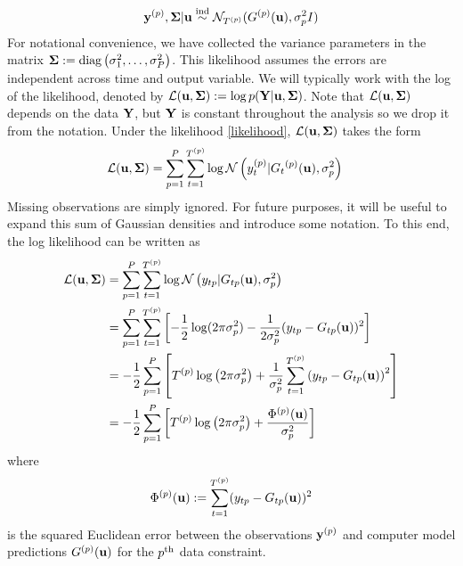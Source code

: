 \documentclass[12pt]{article}
\begin{document}
\begin{align}
\mathbf{y}^{(p)}, \boldsymbol{\Sigma} | \mathbf{u} \overset{\text{ind}}{\sim} \mathcal{N}_{{T}^{(p)}}({G}^{(p)}(\mathbf{u}), \sigma_{p}^2 I) \label{likelihood}
\end{align}
For notational convenience, we have collected the 
variance parameters in the matrix $\boldsymbol{\Sigma} := \text{diag}\left(\sigma_1^2, \dots, \sigma_{P}^2 \right)$. 
This likelihood assumes the errors are independent across time and output variable. 
We will typically work with the log of the likelihood, denoted by 
$\mathcal{L}(\mathbf{u}, \boldsymbol{\Sigma}) := \log p(\mathbf{Y}|\mathbf{u}, \boldsymbol{\Sigma})$. Note that $\mathcal{L}(\mathbf{u}, \boldsymbol{\Sigma})$ depends on the data $\mathbf{Y}$, 
but $\mathbf{Y}$ is constant throughout the analysis so we drop it from the notation.
Under the likelihood \ref{likelihood}, $\mathcal{L}(\mathbf{u}, \boldsymbol{\Sigma})$ takes the form 
\begin{align*}
\mathcal{L}(\mathbf{u}, \boldsymbol{\Sigma}) &= \sum_{p = 1}^{P} \sum_{t = 1}^{{T}^{(p)}} \log \mathcal{N}\left(y_{t}^{(p)} | {{G}_{t}}^{(p)}(\mathbf{u}), \sigma_{p}^2 \right)
\end{align*}
Missing observations are simply ignored. For future purposes, it will be useful to expand this sum of Gaussian densities and introduce some notation. To this end, the log likelihood can be written as 
\begin{align}
\mathcal{L}(\mathbf{u}, \boldsymbol{\Sigma}) &= \sum_{p = 1}^{P} \sum_{t = 1}^{{T}^{(p)}} \log \mathcal{N}\left(y_{t p}| G_{t p}(\mathbf{u}), \sigma_{p}^2 \right) \nonumber \\
	         &= \sum_{p = 1}^{P}  \sum_{t = 1}^{{T}^{(p)}} \left[-\frac{1}{2} \log(2\pi \sigma_{p}^2) - \frac{1}{2\sigma_{p}^2} (y_{t p} - G_{t p}(\mathbf{u}))^2\right] \nonumber \\
	         &= -\frac{1}{2} \sum_{p = 1}^{P} \left[{T}^{(p)} \log\left(2\pi \sigma_{p}^2 \right) + \frac{1}{\sigma_{p}^2}\sum_{t = 1}^{{T}^{(p)}} \left(y_{t p} - 
	                G_{t p}(\mathbf{u})\right)^2  \right] \nonumber \\
	         &= -\frac{1}{2} \sum_{p = 1}^{P} \left[{T}^{(p)} \log\left(2\pi \sigma_{p}^2 \right) + \frac{{\Phi}^{(p)}(\mathbf{u})}{\sigma_{p}^2} \right] \label{llik}
\end{align}
where 
\begin{align}
{\Phi}^{(p)}(\mathbf{u}) := \sum_{t = 1}^{{T}^{(p)}} (y_{t p} - G_{t p}(\mathbf{u}))^2
\end{align}
is the squared Euclidean error between the observations $\mathbf{y}^{(p)}$ and computer model predictions ${G}^{(p)}(\mathbf{u})$ for the $p^{\text{th}}$ data constraint. 
\end{document}
